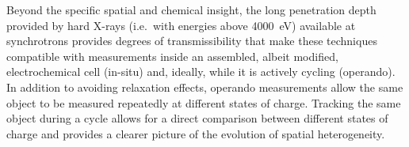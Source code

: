 \documentclass{article}
\begin{document}
Beyond the specific spatial and chemical insight, the long penetration
depth provided by hard X-rays (i.e.\ with energies above
\SI{4000}{\electronvolt}) available at synchrotrons provides degrees
of transmissibility that make these techniques compatible with
measurements inside an assembled, albeit modified, electrochemical
cell (in-situ) and, ideally, while it is actively cycling
(operando). In addition to avoiding relaxation effects, operando
measurements allow the same object to be measured repeatedly at
different states of charge. Tracking the same object during a cycle
allows for a direct comparison between different states of charge and
provides a clearer picture of the evolution of spatial heterogeneity.




\end{document}
